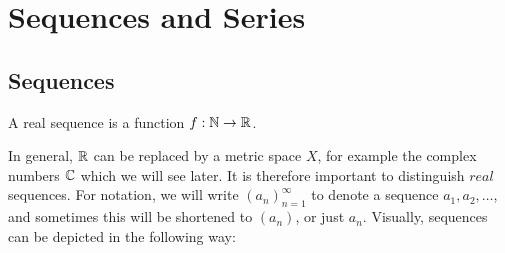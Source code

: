 \documentclass[../analysis1.tex]{subfiles}
\begin{document}
\chapter{Sequences and Series}

\section{Sequences}

\begin{definition}
    \begin{shaded*}
        A real sequence is a function $f:\mathbb{N}\to\mathbb{R}$.
    \end{shaded*}
\end{definition}
In general, $\mathbb{R}$ can be replaced by a metric space $X$, for example the complex numbers $\mathbb{C}$ which we will see later. It is therefore important to distinguish $real$ sequences. For notation, we will write $(a_n)_{n=1}^{\infty}$ to denote a sequence $a_1,a_2,\dots$, and sometimes this will be shortened to $(a_n)$, or just $a_n$. 
Visually, sequences can be depicted in the following way:

\begin{center}
    \begin{minipage}{0.48\textwidth}
        \centering
    \end{minipage}\hfill
    \begin{minipage}{0.48\textwidth}
        \centering
    \end{minipage}
\end{center}
\end{document}
